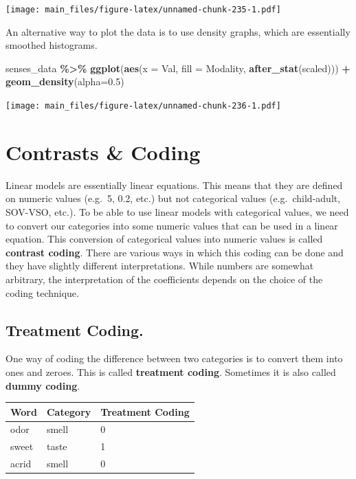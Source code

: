 \documentclass[
]{book}
\newenvironment{Shaded}{\begin{snugshade}}{\end{snugshade}}
\newcommand{\AttributeTok}[1]{\textcolor[rgb]{0.13,0.29,0.53}{#1}}
\newcommand{\FloatTok}[1]{\textcolor[rgb]{0.00,0.00,0.81}{#1}}
\newcommand{\FunctionTok}[1]{\textcolor[rgb]{0.13,0.29,0.53}{\textbf{#1}}}
\newcommand{\NormalTok}[1]{#1}
\newcommand{\SpecialCharTok}[1]{\textcolor[rgb]{0.81,0.36,0.00}{\textbf{#1}}}
\begin{document}
\texttt{[image: main\_files/figure-latex/unnamed-chunk-235-1.pdf]}

An alternative way to plot the data is to use density graphs, which are essentially smoothed histograms.

\begin{Shaded}
\begin{Highlighting}[]
\NormalTok{senses\_data }\SpecialCharTok{\%\textgreater{}\%} \FunctionTok{ggplot}\NormalTok{(}\FunctionTok{aes}\NormalTok{(}\AttributeTok{x =}\NormalTok{ Val, }\AttributeTok{fill =}\NormalTok{ Modality, }\FunctionTok{after\_stat}\NormalTok{(scaled))) }\SpecialCharTok{+} 
  \FunctionTok{geom\_density}\NormalTok{(}\AttributeTok{alpha=}\FloatTok{0.5}\NormalTok{) }
\end{Highlighting}
\end{Shaded}

\texttt{[image: main\_files/figure-latex/unnamed-chunk-236-1.pdf]}

\hypertarget{contrasts-coding}{%
\section{Contrasts \& Coding}\label{contrasts-coding}}

Linear models are essentially linear equations. This means that they are defined on numeric values (e.g.~5, 0.2, etc.) but not categorical values (e.g.~child-adult, SOV-VSO, etc.). To be able to use linear models with categorical values, we need to convert our categories into some numeric values that can be used in a linear equation. This conversion of categorical values into numeric values is called \textbf{contrast coding}. There are various ways in which this coding can be done and they have slightly different interpretations. While numbers are somewhat arbitrary, the interpretation of the coefficients depends on the choice of the coding technique.

\hypertarget{treatment-coding.}{%
\subsection{Treatment Coding.}\label{treatment-coding.}}

One way of coding the difference between two categories is to convert them into ones and zeroes. This is called \textbf{treatment coding}. Sometimes it is also called \textbf{dummy coding}.

\begin{longtable}[]{@{}lll@{}}
\toprule\noalign{}
\textbf{Word} & \textbf{Category} & \textbf{Treatment Coding} \\
\midrule\noalign{}
\endhead
\bottomrule\noalign{}
\endlastfoot
odor & smell & 0 \\
sweet & taste & 1 \\
acrid & smell & 0 \\
\end{longtable}
\end{document}
